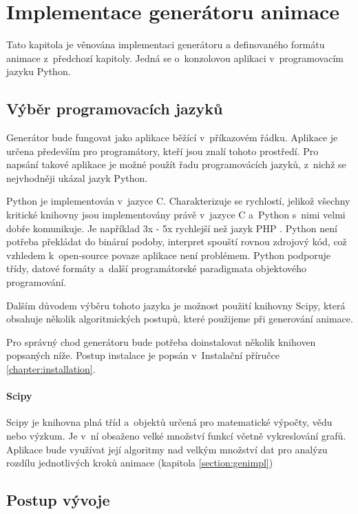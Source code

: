 \chapter{Implementace generátoru animace}

Tato kapitola je věnována implementaci generátoru a definovaného formátu animace z~předchozí kapitoly. Jedná se o~konzolovou aplikaci v~programovacím jazyku Python.

\section{Výběr programovacích jazyků}

Generátor bude fungovat jako aplikace běžící v~příkazovém řádku. Aplikace je určena především pro programátory, kteří jsou znalí tohoto prostředí. Pro napsání takové aplikace je možné použít řadu programovácích jazyků, z~nichž se nejvhodněji ukázal jazyk Python\cite{python}.

Python je implementován v~jazyce C\cite{c}. Charakterizuje se rychlostí, jelikož všechny kritické knihovny jsou implementovány právě v~jazyce C a~Python s~nimi velmi dobře komunikuje. Je například 3x - 5x rychlejší než jazyk PHP \cite{phpvspython}. Python není potřeba překládat do binární podoby, interpret spouští rovnou zdrojový kód, což vzhledem k~open-source povaze aplikace není problémem.  Python podporuje třídy, datové formáty a~další programátorské paradigmata objektového programování.

Dalším důvodem výběru tohoto jazyka je možnost použití knihovny Scipy\cite{Scipy}, která obsahuje několik algoritmických postupů, které použijeme při generování animace. 

Pro správný chod generátoru bude potřeba doinstalovat několik knihoven popsaných níže. Postup instalace je popsán v~Instalační příručce \ref{chapter:installation}.

\subsubsection*{Scipy}

Scipy je knihovna plná tříd a~objektů určená pro matematické výpočty, vědu nebo výzkum\cite{Scipy}. Je v~ní obsaženo velké množství funkcí včetně vykreslování grafů. Aplikace bude využívat její algoritmy nad velkým množství dat pro analýzu rozdílu jednotlivých kroků animace (kapitola \ref{section:genimpl})


\section{Postup vývoje}

